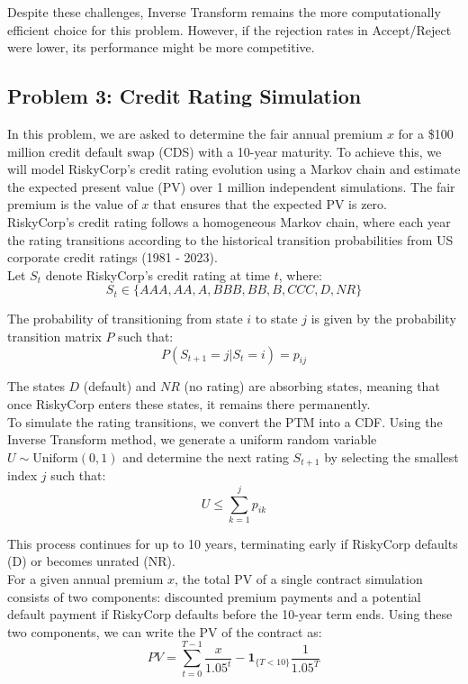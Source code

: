 \documentclass{report}
\begin{document}
Despite these challenges, Inverse Transform remains the more computationally efficient choice for this problem. However, if the rejection rates in Accept/Reject were lower, its performance might be more competitive.

\subsection*{Problem 3: Credit Rating Simulation}
In this problem, we are asked to determine the fair annual premium $x$ for a \$100 million credit default swap (CDS) with a 10-year maturity. To achieve this, we will model RiskyCorp's credit rating evolution using a Markov chain and estimate the expected present value (PV) over 1 million independent simulations. The fair premium is the value of $x$ that ensures that the expected PV is zero. \\

RiskyCorp's credit rating follows a homogeneous Markov chain, where each year the rating transitions according to the historical transition probabilities from US corporate credit ratings (1981 - 2023). \\

Let $S_t$ denote RiskyCorp's credit rating at time $t$, where:
\[
S_t \in \{AAA, AA, A, BBB, BB, B, CCC, D, NR\}
\]

The probability of transitioning from state $i$ to state $j$ is given by the probability transition matrix $P$ such that:
\[
P(S_{t+1} = j | S_t=i) = p_{ij}
\]

The states $D$ (default) and $NR$ (no rating) are absorbing states, meaning that once RiskyCorp enters these states, it remains there permanently. \\

To simulate the rating transitions, we convert the PTM into a CDF. Using the Inverse Transform method, we generate a uniform random variable $U \sim \text{Uniform}(0, 1)$ and determine the next rating $S_{t+1}$ by selecting the smallest index $j$ such that:
\[
U \leq \sum_{k=1}^{j} p_{ik}
\]

This process continues for up to 10 years, terminating early if RiskyCorp defaults (D) or becomes unrated (NR). \\

For a given annual premium $x$, the total PV of a single contract simulation consists of two components: discounted premium payments and a potential default payment if RiskyCorp defaults before the 10-year term ends. Using these two components, we can write the PV of the contract as:
\[
PV = \sum_{t=0}^{T-1} \frac{x}{1.05^t} - \mathbf{1}_{\{T < 10\}}\frac{1}{1.05^T}
\]
\end{document}

